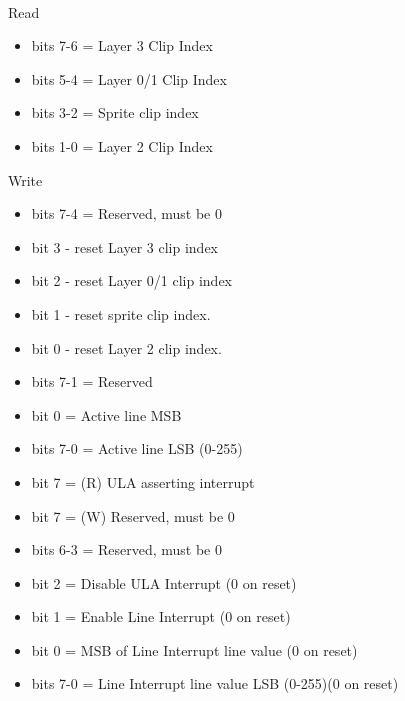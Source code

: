 \\
Read
\begin{itemize}
\item bits 7-6 = Layer 3 Clip Index
\item bits 5-4 = Layer 0/1 Clip Index
\item bits 3-2 = Sprite clip index
\item bits 1-0 = Layer 2 Clip Index
\end{itemize}
Write
\begin{itemize}
\item bits 7-4 = Reserved, must be 0
\item bit 3 - reset Layer 3 clip index
\item bit 2 - reset Layer 0/1 clip index
\item bit 1 - reset sprite clip index.
\item bit 0 - reset Layer 2 clip index.
\end{itemize}

\begin{itemize}
\item bits 7-1 = Reserved
\item bit 0 = Active line MSB
\end{itemize}

\begin{itemize}
\item bits 7-0 = Active line LSB (0-255)
\end{itemize}

\begin{itemize}
\item bit 7 = (R) ULA asserting interrupt
\item bit 7 = (W) Reserved, must be 0
\item bits 6-3 = Reserved, must be 0
\item bit 2 = Disable ULA Interrupt (0 on reset)
\item bit 1 = Enable Line Interrupt (0 on reset)
\item bit 0 = MSB of Line Interrupt line value (0 on reset)
\end{itemize}

\begin{itemize}
\item bits 7-0 = Line Interrupt line value LSB (0-255)(0 on reset)
\end{itemize}

